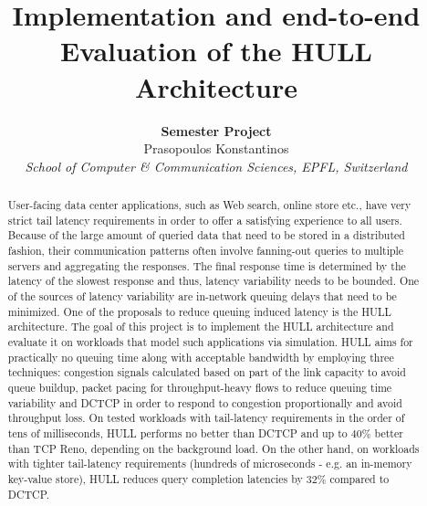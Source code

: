 \documentclass[10pt,conference,compsocconf]{IEEEtran}
\begin{document}
\title{Implementation and end-to-end Evaluation of the HULL Architecture}

\author{
  \textbf{Semester Project} \\
  Prasopoulos Konstantinos \\
  \textit{School of Computer \& Communication Sciences, EPFL, Switzerland}
}

\maketitle
\thispagestyle{plain}
\pagestyle{plain}

\begin{abstract}





User-facing data center applications, such as Web search, online store etc., have very strict tail latency requirements in order to offer a satisfying experience to all users. Because of the large amount of queried data that need to be stored in a distributed fashion, their communication patterns often involve fanning-out queries to multiple servers and aggregating the responses. The final response time is determined by the latency of the slowest response and thus, latency variability needs to be bounded. One of the sources of latency variability are in-network queuing delays that need to be minimized. One of the proposals to reduce queuing induced latency is the HULL architecture. The goal of this project is to implement the HULL architecture and evaluate it on workloads that model such applications via simulation. HULL aims for practically no queuing time along with acceptable bandwidth by employing three techniques: congestion signals calculated based on part of the link capacity to avoid queue buildup, packet pacing for throughput-heavy flows to reduce queuing time variability and DCTCP in order to respond to congestion proportionally and avoid throughput loss. On tested workloads with tail-latency requirements in the order of tens of milliseconds, HULL performs no better than DCTCP and up to $40\%$ better than TCP Reno, depending on the background load. On the other hand, on workloads with tighter tail-latency requirements (hundreds of microseconds - e.g. an in-memory key-value store), HULL reduces query completion latencies by $32\%$ compared to DCTCP.


\end{abstract}
\end{document}
